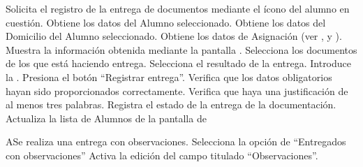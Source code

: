 \begin{UCtrayectoria}
	\UCpaso[\UCactor] Solicita el registro de la entrega de documentos mediante el ícono \IUEstadoEdit{} del alumno en cuestión.
	\UCpaso Obtiene los datos del Alumno seleccionado.
	\UCpaso Obtiene los datos del Domicilio del Alumno seleccionado.
	\UCpaso Obtiene los datos de Asignación (ver ,  y ).
	\UCpaso Muestra la información obtenida mediante la pantalla .
	\UCpaso[\UCactor] Selecciona los documentos de los que está haciendo entrega.
	\UCpaso[\UCactor] Selecciona el resultado de la entrega.
	\UCpaso[\UCactor] Introduce la .
	\UCpaso[\UCactor] Presiona el botón ``Registrar entrega''.
	\UCpaso Verifica que los datos obligatorios hayan sido proporcionados correctamente.
	\UCpaso Verifica que haya una justificación de al menos tres palabras.
	\UCpaso \label{paso:CU4-1Registra}Registra el estado de la entrega de la documentación.
	\UCpaso Actualiza la lista de Alumnos de la pantalla de 
\end{UCtrayectoria}


\begin{UCtrayectoriaA}{A}{Se realiza una entrega con observaciones.}
	\UCpaso[\UCactor] Selecciona la opción de ``Entregados con observaciones''
	\UCpaso Activa la edición del campo titulado ``Observaciones''.
\end{UCtrayectoriaA}

%
%

